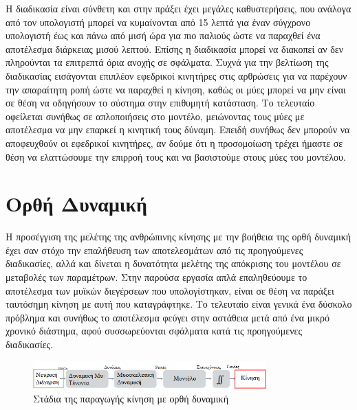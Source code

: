 Η διαδικασία είναι σύνθετη και στην πράξει έχει μεγάλες καθυστερήσεις, που ανάλογα από τον υπολογιστή μπορεί να κυμαίνονται από 15 λεπτά για έναν σύγχρονο υπολογιστή έως και πάνω από μισή ώρα για πιο παλιούς ώστε να παραχθεί ένα αποτέλεσμα διάρκειας μισού λεπτού. Επίσης η διαδικασία μπορεί να διακοπεί αν δεν πληρούνται τα επιτρεπτά όρια ανοχής σε σφάλματα. Συχνά για την βελτίωση της διαδικασίας εισάγονται επιπλέον εφεδρικοί κινητήρες στις αρθρώσεις για να παρέχουν την απαραίτητη ροπή ώστε να παραχθεί η κίνηση, καθώς οι μύες μπορεί να μην είναι σε θέση να οδηγήσουν το σύστημα στην επιθυμητή κατάσταση. Το τελευταίο οφείλεται συνήθως σε απλοποιήσεις στο μοντέλο, μειώνοντας τους μύες με αποτέλεσμα να μην επαρκεί η κινητική τους δύναμη. Επειδή συνήθως δεν μπορούν να αποφευχθούν οι εφεδρικοί κινητήρες, αν δούμε ότι η προσομοίωση τρέχει ήμαστε σε θέση να ελαττώσουμε την επιρροή τους και να βασιστούμε στους μύες του μοντέλου.

\section{Ορθή Δυναμική}

Η προσέγγιση της μελέτης της ανθρώπινης κίνησης με την βοήθεια της ορθή δυναμική έχει σαν στόχο την επαλήθευση των αποτελεσμάτων από τις προηγούμενες διαδικασίες, αλλά και δίνεται η δυνατότητα μελέτης της απόκρισης του μοντέλου σε μεταβολές των παραμέτρων. Στην παρούσα εργασία απλά επαληθεύουμε το αποτέλεσμα των μυϊκών διεγέρσεων που υπολογίστηκαν, είναι σε θέση να παράξει ταυτόσημη κίνηση με αυτή που καταγράφτηκε. Το τελευταίο είναι γενικά ένα δύσκολο πρόβλημα και συνήθως το αποτέλεσμα φεύγει στην αστάθεια μετά από ένα μικρό χρονικό διάστημα, αφού συσσωρεύονται σφάλματα κατά τις προηγούμενες διαδικασίες.

\begin{figure}[H]
    \centering
    \includegraphics[width=0.8\textwidth]{methods/fig/forward-simulation.png}
    \caption{Στάδια της παραγωγής κίνηση με ορθή δυναμική\protect\footnotemark}
    \label{fig:forward-simulation}
\end{figure}

